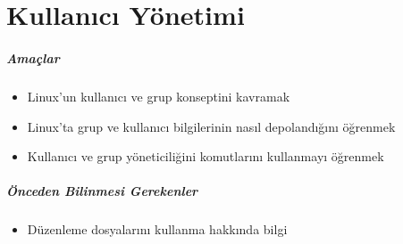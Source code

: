 \chapter{Kullanıcı Yönetimi}
\label{chap:bolum13}
\paragraph{Amaçlar}{
\begin{itemize}
 \item Linux'un kullanıcı ve grup konseptini kavramak
 \item Linux'ta grup ve kullanıcı bilgilerinin nasıl depolandığını öğrenmek
 \item Kullanıcı ve grup yöneticiliğini komutlarını kullanmayı öğrenmek
 \end{itemize}}
\paragraph{Önceden Bilinmesi Gerekenler}
\begin{itemize}
 \item Düzenleme dosyalarını kullanma hakkında bilgi
 \end{itemize}

